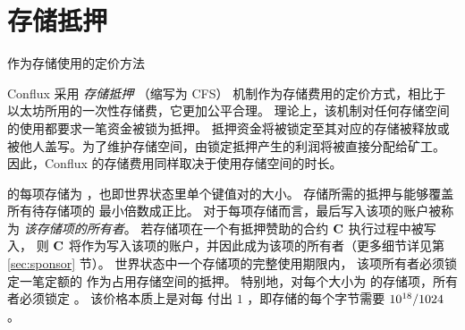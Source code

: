 
\section{存储抵押}
\label{sec:collateral}

作为存储使用的定价方法 

Conflux 采用 \emph{存储抵押} （缩写为 CFS） 机制作为存储费用的定价方式，相比于以太坊所用的一次性存储费，它更加公平合理。
% 
理论上，该机制对任何存储空间的使用都要求一笔资金被锁为抵押。
抵押资金将被锁定至其对应的存储被释放或被他人盖写。为了维护存储空间，由锁定抵押产生的利润将被直接分配给矿工。
因此，Conflux 的存储费用同样取决于使用存储空间的时长。

\name 的每项存储为 \sunitsize，也即世界状态里单个键值对的大小。
存储所需的抵押与能够覆盖所有待存储项的 \sunitsize 最小倍数成正比。
对于每项存储而言，最后写入该项的账户被称为 \emph{该存储项的所有者}。
若存储项在一个有抵押赞助的合约 $\mathbf{C}$ 执行过程中被写入，
则 $\mathbf{C}$ 将作为写入该项的账户，并因此成为该项的所有者（更多细节详见第 \ref{sec:sponsor} 节）。
世界状态中一个存储项的完整使用期限内，
该项所有者必须锁定一笔定额的 \cfx 作为占用存储空间的抵押。
特别地，对每个大小为 \sunitsize 的存储项，所有者必须锁定 \sunitprice。
该价格本质上是对每 \storagepertoken 付出 $1$ \cfx，即存储的每个字节需要 $10^{18}/1024$ \unit。

